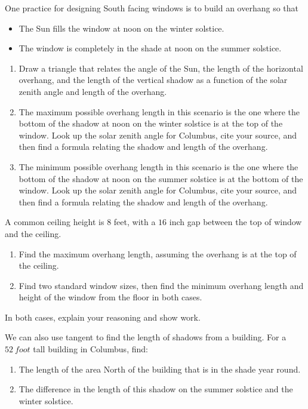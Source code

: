 \documentclass[noauthor,nooutcomes,handout,hints,12pt]{ximera}
\begin{document}
\mynewpage


\begin{question}
 One practice for designing South facing windows is to build an
 overhang so that
 \begin{itemize}
 \item The Sun fills the window at noon on the winter solstice.
 \item The window is completely in the shade at noon on the summer
   solstice.
 \end{itemize}
\begin{enumerate}
\item Draw a triangle that relates the angle of the Sun, the length of
  the horizontal overhang, and the length of the vertical shadow as a
  function of the solar zenith angle and length of the overhang.
\item The maximum possible overhang length in this scenario is the one
  where the bottom of the shadow at noon on the winter solstice is at
  the top of the window. Look up the solar zenith angle for Columbus,
  cite your source, and then find a formula relating the shadow and
  length of the overhang. 
\item The minimum possible overhang length in this scenario is the one
  where the bottom of the shadow at noon on the summer solstice is at
  the bottom of the window. Look up the solar zenith angle for Columbus, cite
  your source, and then find a formula relating the shadow and length
  of the overhang. 
\end{enumerate}
\end{question}
\mynewpage


\begin{question}
 A common ceiling height is $8$ feet, with a $16$ inch gap between the
 top of window and the ceiling.
 
\begin{enumerate}
 \item Find the maximum overhang length, assuming the overhang is at
   the top of the ceiling.
 \item Find two standard window sizes, then find the minimum overhang
   length and height of the window from the floor in both cases.
\end{enumerate}
In both cases, explain your reasoning and show work.
\end{question}
\mynewpage

\begin{question}
 We can also use tangent to find the length of shadows from a
 building. For a $52\ foot$ tall building in Columbus, find:
 
\begin{enumerate}
 \item The length of the area North of the building that is in the
   shade year round.
 \item The difference in the length of this shadow on the summer
   solstice and the winter solstice.
\end{enumerate}
\end{question}
\end{document}
